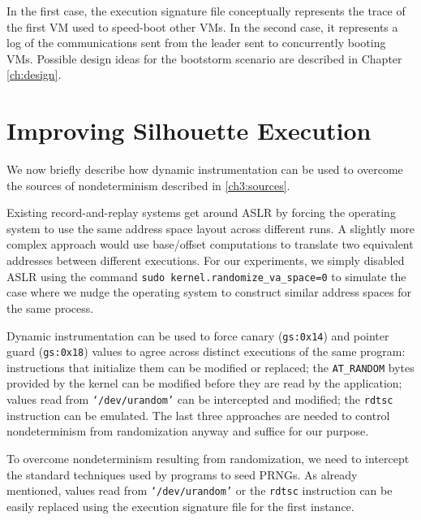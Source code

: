 In the first case, the execution signature file
conceptually represents the trace of the first VM used to speed-boot
other VMs. In the second case, it represents a log of the communications 
sent from the leader sent to concurrently booting VMs. Possible
design ideas for the bootstorm scenario are described 
in Chapter \ref{ch:design}.

\section{Improving Silhouette Execution}
We now briefly describe how dynamic instrumentation can be used to overcome
the sources of nondeterminism described in \ref{ch3:sources}. \newline

 \newline
Existing record-and-replay systems get around ASLR by
forcing the operating system to use the same address space layout across
different runs. A slightly more complex approach 
would use base/offset computations to translate two equivalent 
addresses between different executions. 
For our experiments, we simply disabled ASLR using the command
\texttt {sudo kernel.randomize\_va\_space=0} to simulate the 
case where we nudge the operating system to construct
similar address spaces for the same process. \newline

 \newline
Dynamic instrumentation can be used to force canary (\texttt{gs:0x14})
and pointer guard (\texttt{gs:0x18}) values
to agree across distinct executions of the same program:
instructions that initialize them can be
modified or replaced; the \texttt{AT\_RANDOM} bytes 
provided by the kernel can be
modified before they are read by the application; 
values read from \texttt{`/dev/urandom'} can be 
intercepted and modified; the \texttt{rdtsc} instruction can be emulated.
The last three approaches are needed to control nondeterminism
from randomization anyway and suffice for our purpose. \newline

 \newline
To overcome nondeterminism resulting from randomization,
we need to intercept the standard techniques
used by programs to seed PRNGs.
As already mentioned, values read from \texttt{`/dev/urandom'}
or the \texttt{rdtsc} instruction can be easily replaced
using the execution signature file for the first instance.

